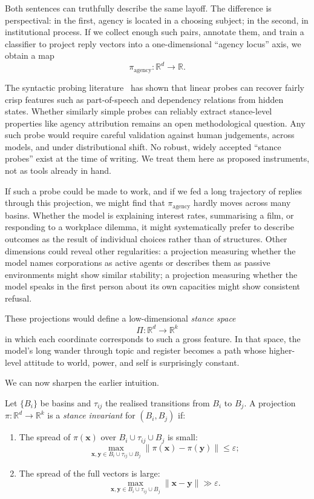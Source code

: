 Both sentences can truthfully describe the same layoff. The difference is perspectival: in the first, agency is located in a choosing subject; in the second, in institutional process. If we collect enough such pairs, annotate them, and train a classifier to project reply vectors into a one-dimensional ``agency locus'' axis, we obtain a map
\[
\pi_{\text{agency}} : \mathbb{R}^d \to \mathbb{R}.
\]

The syntactic probing literature~\cite{belinkov_glass, hewitt_manning} has shown that linear probes can recover fairly crisp features such as part-of-speech and dependency relations from hidden states. Whether similarly simple probes can reliably extract stance-level properties like agency attribution remains an open methodological question. Any such probe would require careful validation against human judgements, across models, and under distributional shift. No robust, widely accepted ``stance probes'' exist at the time of writing. We treat them here as proposed instruments, not as tools already in hand.

If such a probe could be made to work, and if we fed a long trajectory of replies through this projection, we might find that $\pi_{\text{agency}}$ hardly moves across many basins. Whether the model is explaining interest rates, summarising a film, or responding to a workplace dilemma, it might systematically prefer to describe outcomes as the result of individual choices rather than of structures. Other dimensions could reveal other regularities: a projection measuring whether the model names corporations as active agents or describes them as passive environments might show similar stability; a projection measuring whether the model speaks in the first person about its own capacities might show consistent refusal.

These projections would define a low-dimensional \emph{stance space}
\[
\Pi : \mathbb{R}^d \to \mathbb{R}^k
\]
in which each coordinate corresponds to such a gross feature. In that space, the model's long wander through topic and register becomes a path whose higher-level attitude to world, power, and self is surprisingly constant.

We can now sharpen the earlier intuition.

\begin{formalbox}[title={Stance invariants on routes}]
Let $\{B_i\}$ be basins and $\tau_{ij}$ the realised transitions from $B_i$ to $B_j$. A projection $\pi : \mathbb{R}^d \to \mathbb{R}^k$ is a \emph{stance invariant} for $(B_i,B_j)$ if:
\begin{enumerate}
  \item The spread of $\pi(\mathbf{x})$ over $B_i \cup \tau_{ij} \cup B_j$ is small:
  \[
  \max_{\mathbf{x},\mathbf{y} \in B_i \cup \tau_{ij} \cup B_j} \|\pi(\mathbf{x}) - \pi(\mathbf{y})\| \le \varepsilon;
  \]
  \item The spread of the full vectors is large:
  \[
  \max_{\mathbf{x},\mathbf{y} \in B_i \cup \tau_{ij} \cup B_j} \|\mathbf{x} - \mathbf{y}\| \gg \varepsilon.
  \]
\end{enumerate}
\end{formalbox}

